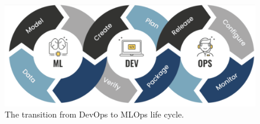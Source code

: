 \begin{figure}[htbp]
    \centering
    \includegraphics[width=0.78\linewidth]{figures/DevOps-To_MLOps.png}
    \caption{The transition from DevOps to MLOps life cycle.}
    \label{fig:DevOps_To_MLOPs}
\end{figure}